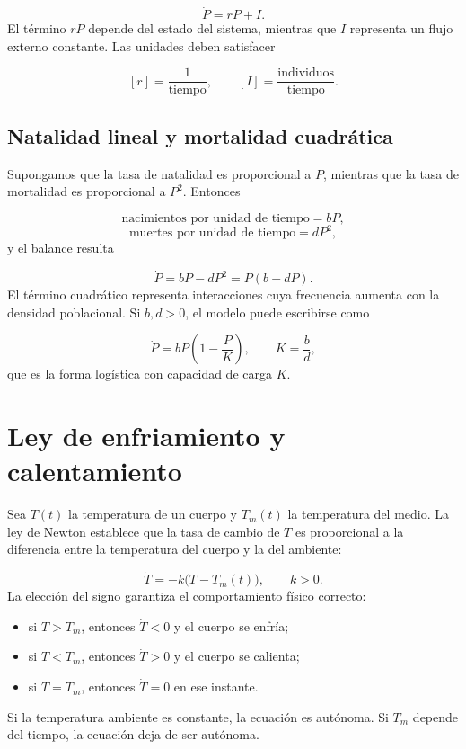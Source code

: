 \documentclass[12pt,a4paper]{article}
\begin{document}
	\[
	\boxed{\dot P=rP+I.}
	\]
	El término \(rP\) depende del estado del sistema, mientras que \(I\) representa un flujo externo constante. Las unidades deben satisfacer

	\[
	[r]=\frac{1}{\text{tiempo}},
	\qquad
	[I]=\frac{\text{individuos}}{\text{tiempo}}.
	\]

	\subsection{Natalidad lineal y mortalidad cuadrática}

	Supongamos que la tasa de natalidad es proporcional a \(P\), mientras que la tasa de mortalidad es proporcional a \(P^2\). Entonces

	\[
	\text{nacimientos por unidad de tiempo}=bP,
	\]
	\[
	\text{muertes por unidad de tiempo}=dP^2,
	\]
	y el balance resulta

	\[
	\boxed{\dot P=bP-dP^2=P(b-dP).}
	\]
	El término cuadrático representa interacciones cuya frecuencia aumenta con la densidad poblacional. Si \(b,d>0\), el modelo puede escribirse como

	\[
	\dot P=bP\left(1-\frac{P}{K}\right),
	\qquad
	K=\frac{b}{d},
	\]
	que es la forma logística con capacidad de carga \(K\).

	\clearpage
	\section{Ley de enfriamiento y calentamiento}

	Sea \(T(t)\) la temperatura de un cuerpo y \(T_m(t)\) la temperatura del medio. La ley de Newton establece que la tasa de cambio de \(T\) es proporcional a la diferencia entre la temperatura del cuerpo y la del ambiente:

	\[
	\boxed{\dot T=-k\bigl(T-T_m(t)\bigr),}
	\qquad k>0.
	\]
	La elección del signo garantiza el comportamiento físico correcto:

	\begin{itemize}[leftmargin=*]
		\item si \(T>T_m\), entonces \(\dot T<0\) y el cuerpo se enfría;
		\item si \(T<T_m\), entonces \(\dot T>0\) y el cuerpo se calienta;
		\item si \(T=T_m\), entonces \(\dot T=0\) en ese instante.
	\end{itemize}

	Si la temperatura ambiente es constante, la ecuación es autónoma. Si \(T_m\) depende del tiempo, la ecuación deja de ser autónoma.
\end{document}
